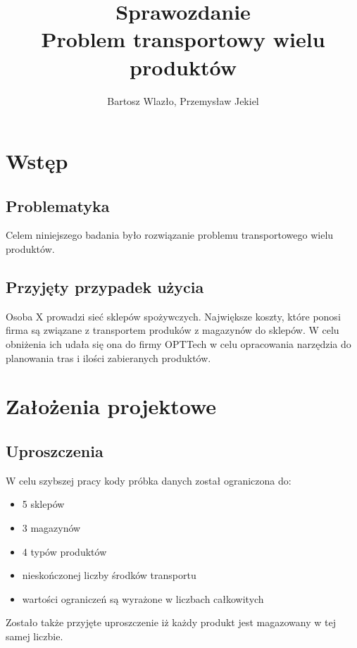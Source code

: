\documentclass[a4paper]{article}
\begin{document}
\title{ \textbf{Sprawozdanie} \protect\\ Problem transportowy wielu produktów}
\author{Bartosz Wlazło, Przemysław Jekiel}
\maketitle
{}

\newpage 


\section{Wstęp}

\subsection{Problematyka}

Celem niniejszego badania było rozwiązanie problemu transportowego wielu produktów. 

\subsection{Przyjęty przypadek użycia}

Osoba X prowadzi sieć sklepów spożywczych. Największe koszty, które ponosi firma są związane z transportem produków z magazynów do sklepów. W celu obniżenia ich udała się ona do firmy OPTTech w celu opracowania narzędzia do planowania tras i ilości zabieranych produktów.

\section{Założenia projektowe}
\subsection{Uproszczenia}
W celu szybszej pracy kody próbka danych został ograniczona do:
\begin{itemize}
	\item 5 sklepów 
	\item 3 magazynów
	\item 4 typów produktów
	\item nieskończonej liczby środków transportu 
	\item wartości ograniczeń są wyrażone w liczbach całkowitych 
\end{itemize}

Zostało także przyjęte uproszczenie iż każdy produkt jest magazowany w tej samej liczbie.
\end{document}
